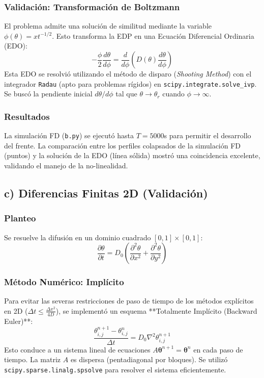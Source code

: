 \documentclass[a4paper,12pt]{article}
\begin{document}
\subsubsection*{Validación: Transformación de Boltzmann}
El problema admite una solución de similitud mediante la variable $\phi(\theta) = x t^{-1/2}$. Esto transforma la EDP en una Ecuación Diferencial Ordinaria (EDO):
\begin{equation}
    -\frac{\phi}{2} \frac{d\theta}{d\phi} = \frac{d}{d\phi} \left( D(\theta) \frac{d\theta}{d\phi} \right)
\end{equation}
Esta EDO se resolvió utilizando el método de disparo (\textit{Shooting Method}) con el integrador \texttt{Radau} (apto para problemas rígidos) en \texttt{scipy.integrate.solve\_ivp}. Se buscó la pendiente inicial $d\theta/d\phi$ tal que $\theta \to \theta_r$ cuando $\phi \to \infty$.

\subsubsection*{Resultados}
La simulación FD (\texttt{b.py}) se ejecutó hasta $T=5000$s para permitir el desarrollo del frente. La comparación entre los perfiles colapsados de la simulación FD (puntos) y la solución de la EDO (línea sólida) mostró una coincidencia excelente, validando el manejo de la no-linealidad.

\subsection{c) Diferencias Finitas 2D (Validación)}

\subsubsection*{Planteo}
Se resuelve la difusión en un dominio cuadrado $[0,1]\times[0,1]$:
\begin{equation}
    \frac{\partial\theta}{\partial t} = D_0 \left( \frac{\partial^2\theta}{\partial x^2} + \frac{\partial^2\theta}{\partial y^2} \right)
\end{equation}

\subsubsection*{Método Numérico: Implícito}
Para evitar las severas restricciones de paso de tiempo de los métodos explícitos en 2D ($\Delta t \le \frac{\Delta x^2}{4D}$), se implementó un esquema **Totalmente Implícito (Backward Euler)**:
\begin{equation}
    \frac{\theta_{i,j}^{n+1} - \theta_{i,j}^n}{\Delta t} = D_0 \nabla^2 \theta_{i,j}^{n+1}
\end{equation}
Esto conduce a un sistema lineal de ecuaciones $A \mathbf{\theta}^{n+1} = \mathbf{\theta}^n$ en cada paso de tiempo. La matriz $A$ es dispersa (pentadiagonal por bloques). Se utilizó \texttt{scipy.sparse.linalg.spsolve} para resolver el sistema eficientemente.
\end{document}
